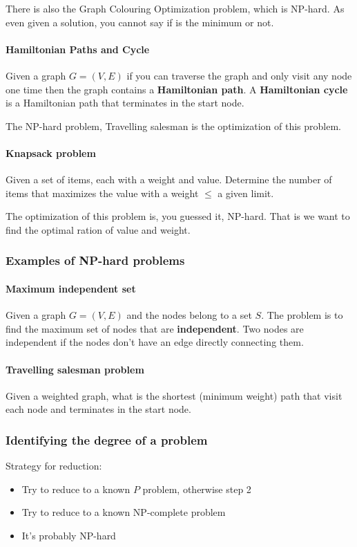 \documentclass[12pt]{article} %
\begin{document}
\par There is also the Graph Colouring Optimization problem, which is NP-hard. As even given a solution, you cannot say if is the minimum or not.

\paragraph{Hamiltonian Paths and Cycle}
Given a graph $G = (V, E)$ if you can traverse the graph and only visit any node one time then the graph contains a \textbf{Hamiltonian path}. A \textbf{Hamiltonian cycle} is a Hamiltonian path that terminates in the start node.

\par The NP-hard problem, Travelling salesman is the optimization of this problem.

\paragraph{Knapsack problem}
Given a set of items, each with a weight and value. Determine the number of items that maximizes the value with a weight $\leq$ a given limit.  

\par The optimization of this problem is, you guessed it, NP-hard. That is we want to find the optimal ration of value and weight.

\subsubsection{Examples of NP-hard problems}

\paragraph{Maximum independent set}
Given a graph $G = (V, E)$ and the nodes belong to a set $S$. The problem is to find the maximum set of nodes that are \textbf{independent}. Two nodes are independent if the nodes don't have an edge directly connecting them.

\paragraph{Travelling salesman problem}
Given a weighted graph, what is the shortest (minimum weight) path that visit each node and terminates in the start node.

\subsubsection{Identifying the degree of a problem}
Strategy for reduction:
\begin{itemize}
    \item Try to reduce to a known $P$ problem, otherwise step 2
    \item Try to reduce to a known NP-complete problem
    \item It's probably NP-hard
\end{itemize}
\end{document}
